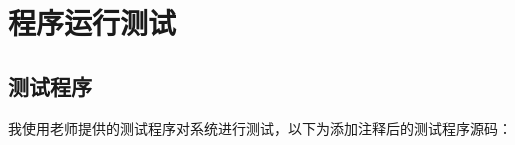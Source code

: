 \documentclass[main.tex]{subfiles}
\begin{document}
\section{程序运行测试}

\subsection{测试程序}
我使用老师提供的测试程序对系统进行测试，以下为添加注释后的测试程序源码：
\inputminted[linenos]{gas}{p1-test-commented.asm}
\end{document}
